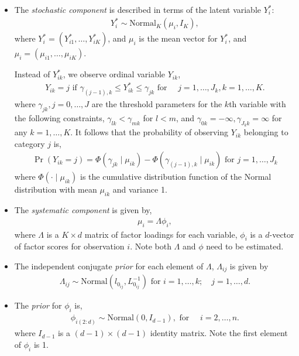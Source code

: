 \begin{itemize}
\item The \emph{stochastic component} is described in terms of the latent
variable $Y_i^*$:
\begin{eqnarray*}
Y_{i}^*  \sim \textrm{Normal}_K(\mu_i, I_K),
\end{eqnarray*}
where $Y_i^*=(Y_{i1}^*, \ldots, Y_{iK}^*)$, and $\mu_i$ is the mean vector
for $Y_i^*$, and $\mu_i=(\mu_{i1},\ldots, \mu_{iK})$.

Instead of $Y_{ik}^*$, we observe ordinal  variable $Y_{ik}$,
\begin{eqnarray*}
Y_{ik} = j \textrm{ if } \gamma_{(j-1),k} \le Y_{ik}^* \le \gamma_{jk}
\textrm{ for } \quad j=1,\ldots, J_k, k=1,\ldots, K.
\end{eqnarray*}
where $\gamma_{jk}, j=0,\ldots, J$ are the threshold parameters for
the $k$th variable with the following constraints, $\gamma_{lk} <
\gamma_{mk}$ for $l < m$, and $\gamma_{0k}=-\infty, \gamma_{J_k
k}=\infty$ for any $k=1, \ldots, K$.  It follows that the probability
of observing $Y_{ik}$ belonging to category $j$ is,
\begin{eqnarray*}
\Pr(Y_{ik}=j) =\Phi(\gamma_{jk} \mid \mu_{ik})-\Phi(\gamma_{(j-1),k} \mid \mu_{ik}) \textrm{ for } j=1,\ldots,J_k
\end{eqnarray*}
where $\Phi(\cdot \mid\mu_{ik})$ is the cumulative distribution
function of the Normal distribution with mean $\mu_{ik}$ and variance
1.

\item The \emph{systematic component} is given by,
\begin{eqnarray*}
\mu_i = \Lambda\phi_i,
\end{eqnarray*}
where $\Lambda$ is a $K \times d$ matrix of factor loadings for each
variable, $\phi_i$ is a $d$-vector of factor scores for observation
$i$. Note both $\Lambda$ and $\phi$ need to be estimated.

\item The independent conjugate \emph{prior} for each element of $\Lambda$,
$\Lambda_{ij}$ is given by
\begin{eqnarray*}
\Lambda_{ij} \sim \textrm{Normal}(l_{0_{ij}}, L_{0_{ij}}^{-1})
\textrm{ for } i=1,\ldots, k; \quad j=1,\ldots, d.
\end{eqnarray*}

\item The \emph{prior} for $\phi_i$ is,
\begin{eqnarray*}
\phi_{i(2:d)} \sim \textrm{Normal}(0, I_{d-1}), \textrm{ for } \quad i=2, \ldots, n.
\end{eqnarray*}
where $I_{d-1}$ is a $ (d-1)\times (d-1) $ identity matrix. Note the
first element of $\phi_i$ is 1.

\end{itemize}


